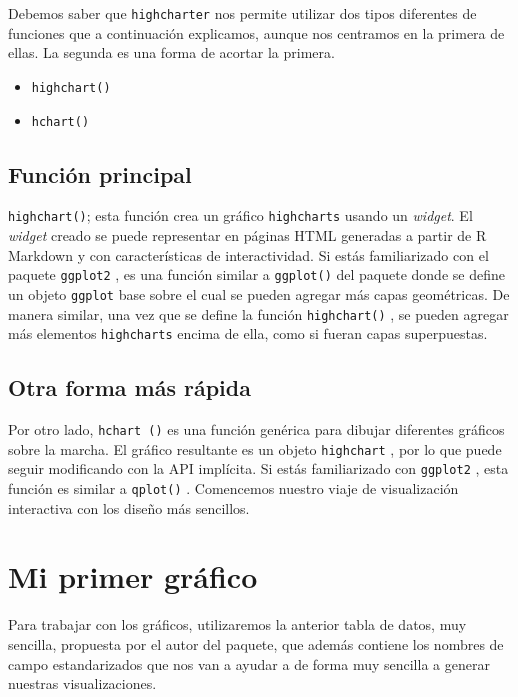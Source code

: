 \documentclass[
]{book}
\providecommand{\tightlist}{%
  \setlength{\itemsep}{0pt}\setlength{\parskip}{0pt}}
\begin{document}
Debemos saber que \texttt{highcharter} nos permite utilizar dos tipos diferentes de funciones que a continuación explicamos, aunque nos centramos en la primera de ellas. La segunda es una forma de acortar la primera.

\begin{itemize}
\tightlist
\item
  \texttt{highchart()}
\item
  \texttt{hchart()}
\end{itemize}

\hypertarget{funciuxf3n-principal}{%
\subsection{Función principal}\label{funciuxf3n-principal}}

\texttt{highchart()}; esta función crea un gráfico \texttt{highcharts} usando un \emph{widget}. El \emph{widget} creado se puede representar en páginas HTML generadas a partir de R Markdown y con características de interactividad. Si estás familiarizado con el paquete \texttt{ggplot2} , es una función similar a \texttt{ggplot()} del paquete donde se define un objeto \texttt{ggplot} base sobre el cual se pueden agregar más capas geométricas. De manera similar, una vez que se define la función \texttt{highchart()} , se pueden agregar más elementos \texttt{highcharts} encima de ella, como si fueran capas superpuestas.

\hypertarget{otra-forma-muxe1s-ruxe1pida}{%
\subsection{Otra forma más rápida}\label{otra-forma-muxe1s-ruxe1pida}}

Por otro lado, \texttt{hchart\ ()} es una función genérica para dibujar diferentes gráficos sobre la marcha. El gráfico resultante es un objeto \texttt{highchart} , por lo que puede seguir modificando con la API implícita. Si estás familiarizado con \texttt{ggplot2} , esta función es similar a \texttt{qplot()} . Comencemos nuestro viaje de visualización interactiva con los diseño más sencillos.

\hypertarget{mi-primer-gruxe1fico}{%
\section{Mi primer gráfico}\label{mi-primer-gruxe1fico}}

Para trabajar con los gráficos, utilizaremos la anterior tabla de datos, muy sencilla, propuesta por el autor del paquete, que además contiene los nombres de campo estandarizados que nos van a ayudar a de forma muy sencilla a generar nuestras visualizaciones.
\end{document}
